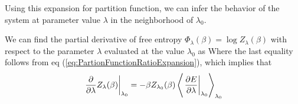 \documentclass[letterpaper,english,10pt]{article}
\begin{document}
Using this expansion for partition function,  
we can infer the behavior of the system at parameter value $\lambda$ in the neighborhood of $\lambda_0$. 

We can find the partial derivative of free entropy $\Phi_\lambda(\beta) = \log Z_\lambda (\beta) $ with respect to the parameter $\lambda$ evaluated at the value $\lambda_0$ as 
Where the last equality follows from eq (\ref{eq:PartionFunctionRatioExpansion}), which implies that 
$$\left. \frac{\partial}{\partial \lambda} Z_\lambda (\beta) \right|_{\lambda_0} = -\beta Z_{\lambda_0}(\beta) \left\langle \left. \frac{\partial E}{\partial \lambda} \right|_{\lambda_0} \right\rangle_{\lambda_0}$$
\end{document}
